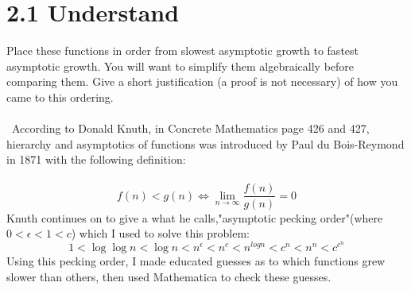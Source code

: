 \documentclass[12pt]{article}
\begin{document}
\section{2.1 Understand}
Place these functions in order from slowest asymptotic growth to fastest asymptotic growth. You will want to simplify them algebraically before comparing them. Give a short justification (a proof is not necessary) of how you came to this ordering.\\\\\
According to Donald Knuth, in Concrete Mathematics page 426 and 427, hierarchy and asymptotics of functions was introduced by Paul du Bois-Reymond in 1871 with the following definition:\\\\ 
\[f(n) < g(n) \Longleftrightarrow \lim_{n\to\infty} \frac{f(n)}{g(n)} = 0\]
Knuth continues on to give a what he calls,"asymptotic pecking order"(where \begin{math}0 < \epsilon < 1 < c\end{math}) which I used to solve this problem:
\[1 < \log{\log{n}} < \log{n} < n^{\epsilon} < n^c < n^{log{n}} < c^n < n^n < c^{c^{n}}\]
Using this pecking order, I made educated guesses as to which functions grew slower than others, then used Mathematica to check these guesses.
\end{document}
